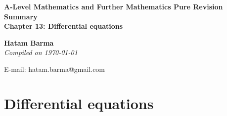 \documentclass[11pt, a4paper]{article}
\begin{document}
\begin{titlepage}
   \begin{center}
       \vspace*{2.5cm}
	\huge
       \textbf{A-Level Mathematics and Further Mathematics Pure Revision Summary} \\
	\vspace{1cm}
	\Large
       \textbf{Chapter 13: Differential equations}
            
       \vspace{1.5cm}
	\LARGE
       \textbf{Hatam Barma} \\
	\vspace{0.75cm}
       \normalsize
       \emph{Compiled on \Datea\today} \\

       \vfill
        

	E-mail: hatam.barma@gmail.com
   \end{center}
\end{titlepage}


\tableofcontents

\clearpage
\section{Differential equations}
\vspace{0.5cm}
\end{document}

